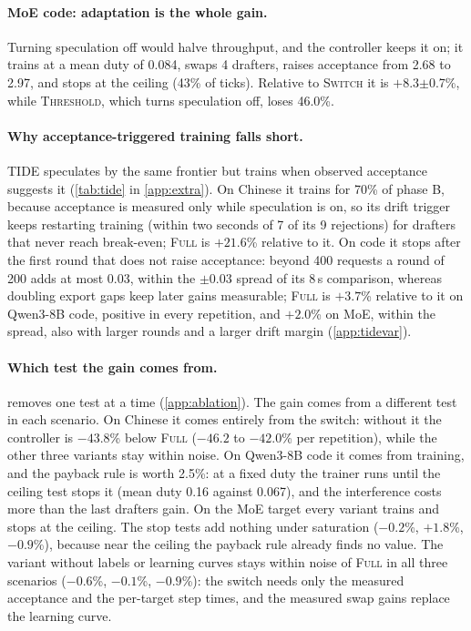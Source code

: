 \documentclass{article}
\newcommand{\pol}[1]{\textsc{#1}}
\begin{document}
\paragraph{MoE code: adaptation is the whole gain.} Turning speculation off would halve throughput, and the controller keeps it on; it trains at a mean duty of 0.084, swaps 4 drafters, raises acceptance from 2.68 to 2.97, and stops at the ceiling (43\% of ticks). Relative to \pol{Switch} it is $+8.3$$\pm$0.7\%, while \pol{Threshold}, which turns speculation off, loses 46.0\%.

\paragraph{Why acceptance-triggered training falls short.} \pol{TIDE} speculates by the same frontier but trains when observed acceptance suggests it (\cref{tab:tide} in \cref{app:extra}). On Chinese it trains for 70\% of phase B, because acceptance is measured only while speculation is on, so its drift trigger keeps restarting training (within two seconds of 7 of its 9 rejections) for drafters that never reach break-even; \pol{Full} is $+21.6$\% relative to it. On code it stops after the first round that does not raise acceptance: beyond 400 requests a round of 200 adds at most 0.03, within the $\pm$0.03 spread of its 8\,s comparison, whereas doubling export gaps keep later gains measurable; \pol{Full} is $+3.7$\% relative to it on Qwen3-8B code, positive in every repetition, and $+2.0$\% on MoE, within the spread, also with larger rounds and a larger drift margin (\cref{app:tidevar}).

\paragraph{Which test the gain comes from.}  removes one test at a time (\cref{app:ablation}). The gain comes from a different test in each scenario. On Chinese it comes entirely from the switch: without it the controller is $-43.8$\% below \pol{Full} ($-46.2$ to $-42.0$\% per repetition), while the other three variants stay within noise. On Qwen3-8B code it comes from training, and the payback rule is worth 2.5\%: at a fixed duty the trainer runs until the ceiling test stops it (mean duty 0.16 against 0.067), and the interference costs more than the last drafters gain. On the MoE target every variant trains and stops at the ceiling. The stop tests add nothing under saturation ($-0.2$\%, $+1.8$\%, $-0.9$\%), because near the ceiling the payback rule already finds no value. The variant without labels or learning curves stays within noise of \pol{Full} in all three scenarios ($-0.6$\%, $-0.1$\%, $-0.9$\%): the switch needs only the measured acceptance and the per-target step times, and the measured swap gains replace the learning curve.
\end{document}
